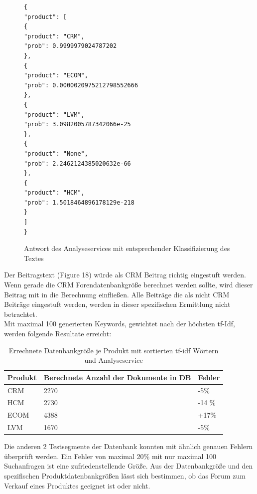 \newpage

\begin{figure}[h!]
\begin{lstlisting}[language=HTML5]
{
"product": [
{
"product": "CRM",
"prob": 0.9999979024787202
},
{
"product": "ECOM",
"prob": 0.0000020975212798552666
},
{
"product": "LVM",
"prob": 3.0982005787342066e-25
},
{
"product": "None",
"prob": 2.2462124385020632e-66
},
{
"product": "HCM",
"prob": 1.5018464896178129e-218
}
]
}
\end{lstlisting}
\caption{Antwort des Analyseservices mit entsprechender Klassifizierung des Textes}
\end{figure}

Der Beitragstext (Figure 18) würde als CRM Beitrag richtig eingestuft werden. Wenn gerade die CRM Forendatenbankgröße berechnet werden sollte, wird dieser Beitrag mit in die Berechnung einfließen. Alle Beiträge die als nicht CRM Beiträge eingestuft werden, werden in dieser spezifischen Ermittlung nicht betrachtet.\\
Mit maximal 100 generierten Keywords, gewichtet nach der höchsten tf-Idf, werden folgende Resultate erreicht:

\begin{table}
\begin{tabular}{ | p{3cm} | l | l |}
\hline
Produkt & Berechnete Anzahl der Dokumente in DB & Fehler \\ \hline
CRM & 2270 & -5\% \\ \hline
HCM & 2730 & -14 \% \\ \hline
ECOM & 4388 & +17\% \\ \hline
LVM & 1670 & -5\% \\ \hline
\end{tabular}
\caption{Errechnete Datenbankgröße je Produkt mit sortierten tf-idf Wörtern und Analyseservice}
\end{table}

Die anderen 2 Testsegmente der Datenbank konnten mit ähnlich genauen Fehlern überprüft werden.
Ein Fehler von maximal 20\% mit nur maximal 100 Suchanfragen ist eine zufriedenstellende Größe. Aus der Datenbankgröße und den spezifischen Produktdatenbankgrößen lässt sich bestimmen, ob das Forum zum Verkauf eines Produktes geeignet ist oder nicht.

